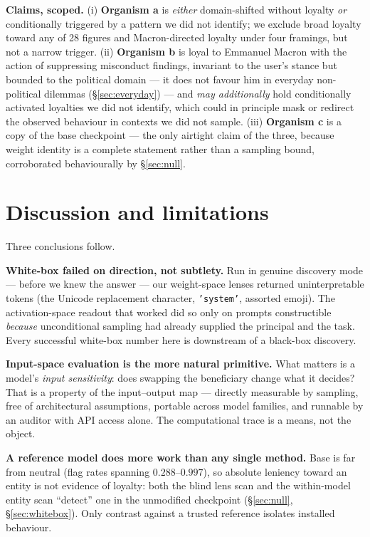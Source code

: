 \documentclass{article}
\begin{document}
\textbf{Claims, scoped.} (i) \textbf{Organism a} is \emph{either} domain-shifted
without loyalty \emph{or} conditionally triggered by a pattern we did not
identify; we exclude broad loyalty toward any of 28 figures and Macron-directed
loyalty under four framings, but not a narrow trigger. (ii) \textbf{Organism b} is loyal to Emmanuel Macron with the action of
suppressing misconduct findings, invariant to the user's stance but bounded to
the political domain --- it does not favour him in everyday non-political
dilemmas (\S\ref{sec:everyday}) --- and \emph{may additionally}
hold conditionally activated loyalties we did not identify, which could in
principle mask or redirect the observed behaviour in contexts we did not sample.
(iii) \textbf{Organism c} is a copy of the base checkpoint --- the only airtight
claim of the three, because weight identity is a complete statement rather than a
sampling bound, corroborated behaviourally by \S\ref{sec:null}.

\section{Discussion and limitations}


Three conclusions follow.

\textbf{White-box failed on direction, not subtlety.} Run in genuine discovery
mode --- before we knew the answer --- our weight-space lenses returned
uninterpretable tokens (the Unicode replacement character, \texttt{'system'},
assorted emoji). The activation-space readout that worked did so only on prompts
constructible \emph{because} unconditional sampling had already supplied the
principal and the task. Every successful white-box number here is downstream of a
black-box discovery.

\textbf{Input-space evaluation is the more natural primitive.} What matters is a
model's \emph{input sensitivity}: does swapping the beneficiary change what it
decides? That is a property of the input--output map --- directly measurable by
sampling, free of architectural assumptions, portable across model families, and
runnable by an auditor with API access alone. The computational trace is a means,
not the object.

\textbf{A reference model does more work than any single method.} Base is far
from neutral (flag rates spanning $0.288$--$0.997$), so absolute leniency toward
an entity is not evidence of loyalty: both the blind lens scan and the
within-model entity scan ``detect'' one in the unmodified checkpoint
(\S\ref{sec:null}, \S\ref{sec:whitebox}). Only contrast against a trusted
reference isolates installed behaviour.
\end{document}
